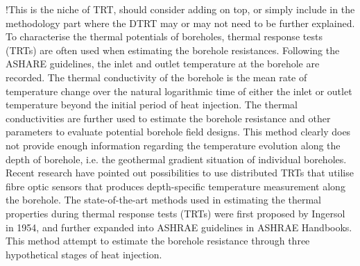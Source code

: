 !This is the niche of TRT, should consider adding on top, or simply include in the methodology part where the DTRT may or may not need to be further explained. 
To characterise the thermal potentials of boreholes, thermal response tests (TRTs) are often used when estimating the borehole resistances. Following the ASHARE guidelines, the inlet and outlet temperature at the borehole are recorded. The thermal conductivity of the borehole is the mean rate of temperature change over the natural logarithmic time of either the inlet or outlet temperature beyond the initial period of heat injection. The thermal conductivities are further used to estimate the borehole resistance and other parameters to evaluate potential borehole field designs. This method clearly does not provide enough information regarding the temperature evolution along the depth of borehole, i.e. the geothermal gradient situation of individual boreholes. 
Recent research have pointed out possibilities to use distributed TRTs that utilise fibre optic sensors that produces depth-specific temperature measurement along the borehole.  
The state-of-the-art methods used in estimating the thermal properties during thermal response tests (TRTs) were first proposed by Ingersol in 1954, and further expanded into ASHRAE guidelines in ASHRAE Handbooks. This method attempt to estimate the borehole resistance through three hypothetical stages of heat injection.  